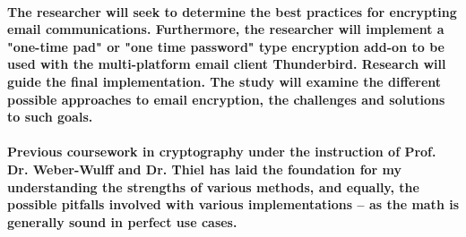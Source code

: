 \documentclass[12pt,a4paper]{article}
\begin{document}
%
%
%
%

\paragraph{The researcher will seek to determine the best practices for encrypting email communications. Furthermore, the researcher will implement a "one-time pad" or "one time password" type encryption add-on to be used with the multi-platform email client Thunderbird. Research will guide the final implementation. The study will examine the different possible approaches to email encryption, the challenges and solutions to such goals.}

\paragraph{Previous coursework in cryptography under the instruction of Prof. Dr. Weber-Wulff and Dr. Thiel has laid the foundation for my understanding the strengths of various methods, and equally, the possible pitfalls involved with various implementations -- as the math is generally sound in perfect use cases.}
\end{document}

